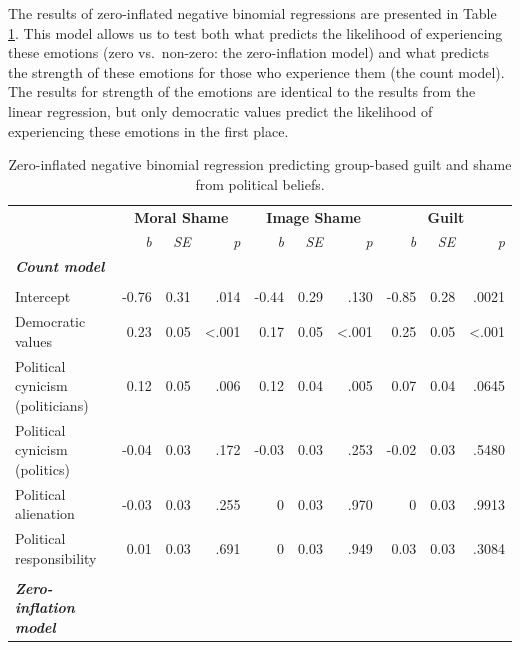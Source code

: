 \documentclass[
]{article}
\begin{document}
The results of zero-inflated negative binomial regressions are presented in Table \ref{tab:TableS2}. This model allows us to test both what predicts the likelihood of experiencing these emotions (zero vs.~non-zero: the zero-inflation model) and what predicts the strength of these emotions for those who experience them (the count model). The results for strength of the emotions are identical to the results from the linear regression, but only democratic values predict the likelihood of experiencing these emotions in the first place.

\begin{table}[H]
\centering
\caption{\label{tab:TableS2}Zero-inflated negative binomial regression predicting group-based guilt and shame from political beliefs.}
\centering
\fontsize{8}{10}\selectfont
\begin{tabular}[t]{lrrrrrrrrr}
\toprule
\multicolumn{1}{c}{\textbf{}} & \multicolumn{3}{c}{\textbf{Moral Shame}} & \multicolumn{3}{c}{\textbf{Image Shame}} & \multicolumn{3}{c}{\textbf{Guilt}} \\
\cmidrule(l{3pt}r{3pt}){2-4} \cmidrule(l{3pt}r{3pt}){5-7} \cmidrule(l{3pt}r{3pt}){8-10}
\em{ } & \em{b} & \em{SE} & \em{p} & \em{b} & \em{SE} & \em{p} & \em{b} & \em{SE} & \em{p}\\
\midrule
\em{\textbf{Count model}} & \em{\textbf{}} & \em{\textbf{}} & \em{\textbf{}} & \em{\textbf{}} & \em{\textbf{}} & \em{\textbf{}} & \em{\textbf{}} & \em{\textbf{}} & \em{\textbf{}}\\
\midrule\\
Intercept & -0.76 & 0.31 & .014 & -0.44 & 0.29 & .130 & -0.85 & 0.28 & .0021\\
Democratic values & 0.23 & 0.05 & <.001 & 0.17 & 0.05 & <.001 & 0.25 & 0.05 & <.001\\
Political cynicism (politicians) & 0.12 & 0.05 & .006 & 0.12 & 0.04 & .005 & 0.07 & 0.04 & .0645\\
Political cynicism (politics) & -0.04 & 0.03 & .172 & -0.03 & 0.03 & .253 & -0.02 & 0.03 & .5480\\
\addlinespace
Political alienation & -0.03 & 0.03 & .255 & 0 & 0.03 & .970 & 0 & 0.03 & .9913\\
Political responsibility & 0.01 & 0.03 & .691 & 0 & 0.03 & .949 & 0.03 & 0.03 & .3084\\
\midrule\\
\em{\textbf{Zero-inflation model}} & \em{\textbf{}} & \em{\textbf{}} & \em{\textbf{}} & \em{\textbf{}} & \em{\textbf{}} & \em{\textbf{}} & \em{\textbf{}} & \em{\textbf{}} & \em{\textbf{}}\\

\end{tabular}
\end{table}
\end{document}
